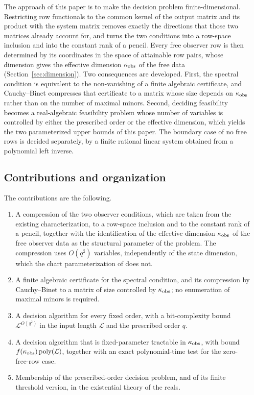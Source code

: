 \documentclass[journal]{IEEEtran}
\theoremstyle{plainn}
\begin{document}
The approach of this paper is to make the decision problem finite-dimensional. Restricting
row functionals to the common kernel of the output matrix and its product with the system
matrix removes exactly the directions that those two matrices already account for, and
turns the two conditions into a row-space inclusion and into the constant rank of a
pencil. Every free observer row is then determined by its coordinates in the space of
attainable row pairs, whose dimension gives the effective dimension $\kappa_{\rm obs}$ of
the free data (Section~\ref{sec:dimension}). Two consequences are developed. First, the
spectral condition is equivalent to the non-vanishing of a finite algebraic certificate,
and Cauchy--Binet compresses that certificate to a matrix whose size depends on
$\kappa_{\rm obs}$ rather than on the number of maximal minors. Second, deciding
feasibility becomes a real-algebraic feasibility problem whose number of variables is
controlled by either the prescribed order or the effective dimension, which yields the two
parameterized upper bounds of this paper. The boundary case of no free rows is decided
separately, by a finite rational linear system obtained from a polynomial left inverse.

\subsection{Contributions and organization}\label{sec:contrib}

The contributions are the following.

\begin{enumerate}
\item A compression of the two observer conditions, which are taken from the existing
characterization, to a row-space inclusion and to the constant rank of a pencil, together
with the identification of the effective dimension $\kappa_{\rm obs}$ of the free observer
data as the structural parameter of the problem. The compression uses $O(q^2)$ variables,
independently of the state dimension, which the chart parameterization of
\cite{fer26b} does not.
\item A finite algebraic certificate for the spectral condition, and its compression by
Cauchy--Binet to a matrix of size controlled by $\kappa_{\rm obs}$; no enumeration of
maximal minors is required.
\item A decision algorithm for every fixed order, with a bit-complexity bound
$\mathcal L^{O(q^2)}$ in the input length $\mathcal L$ and the prescribed order $q$.
\item A decision algorithm that is fixed-parameter tractable in $\kappa_{\rm obs}$, with
bound $f(\kappa_{\rm obs})\operatorname{poly}(\mathcal L)$, together with an exact
polynomial-time test for the zero-free-row case.
\item Membership of the prescribed-order decision problem, and of its finite threshold
version, in the existential theory of the reals.
\end{enumerate}
\end{document}
